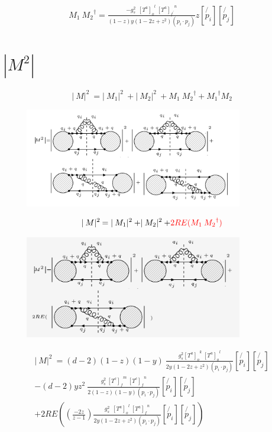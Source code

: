 \begin{equation}
\begin{split}
M_1\: {M_2}^{\dagger} = \frac{-g_s^2 \:\:{[T^a]_o}^l \:{[T^a]_{f^{\prime}}}^n }{(1-z)y(1-2z+z^2)(p_i \cdot p_j)} 
z[\not{p_i}][\not{p_j}]
\end{split}
\end{equation}

\pagebreak

\section{$|M^{2}|$}
\begin{equation}
\lvert\:M\lvert^2\: = \lvert\:M_1\lvert^2\:+\lvert\:M_2\lvert^2\:+ M_1\: {M_2}^{\dagger} +{M_1}^{\dagger} M_2
\end{equation}
\begin{figure}[h!]
\centering
\includegraphics[width=0.85\textwidth]{images/qqgMSquer.png}
\end{figure}
\begin{equation}
\lvert\:M\lvert^2\: = \lvert\:M_1\lvert^2\:+\lvert\:M_2\lvert^2\:+ {\color[RGB]{255,0,0} 2RE(M_1\: {M_2}^{\dagger})}
\end{equation}
\begin{figure}[h!]
\centering
\includegraphics[width=0.85\textwidth]{images/REqqgMSquer.png}
\end{figure}
\begin{equation}
\begin{split}
\lvert\:M\lvert^2\: = (d-2)(1-z)(1-y)\:\frac{g_s^2  {[T^a]_{o}}^k \: {[T^a]_o}^l }{2y(1-2z+z^2)(p_i \cdot p_j)}
[\not{p_i}][\not{p_j}]\\
-(d-2)yz^2\:\frac{g_s^2 \: {[T^c]_f}^m \: {[T^c]_{f}}^n }{2(1-z)(1-y)(p_i \cdot p_j)}
[\not{p_i}][\not{p_j}]\\
+2RE((\frac{-2z}{z-1}) \frac{g_s^2 \:\:{[T^a]_o}^l \:{[T^a]_{f}}^n }{2y(1-2z+z^2)(p_i \cdot p_j)} 
[\not{p_i}][\not{p_j}])
\end{split}
\end{equation}

